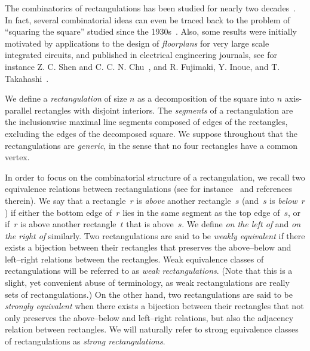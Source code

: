 \documentclass{amsart}
\theoremstyle{definition}
\newcommand{\darkblue}{\color{darkblue}} %
\newcommand{\defn}[1]{\textsl{\darkblue #1}} %
\begin{document}
The combinatorics of rectangulations has been studied for nearly two decades~\cite{MR2233287,MR2763051,MR2871762,MR2864445,MR3084577,MR3192492,MR3878132,MR4598046,MR4667583,AB24,ACFF24}.
In fact, several combinatorial ideas can even be traced back to the problem of ``squaring the square'' studied since the 1930s~\cite{A30,Abe32,MR0000470,MR0003040}. Also, some results were initially motivated by applications to the design of \defn{floorplans} for very large scale integrated circuits, and published in electrical engineering journals, see for instance Z. C. Shen and C. C. N. Chu~\cite{SC03}, and R. Fujimaki, Y. Inoue, and T. Takahashi~\cite{FT07,TF08,ITF09,FIT09}.

We define a \defn{rectangulation} of size $n$ as a decomposition of the square into $n$ axis-parallel rectangles with disjoint interiors.
The \defn{segments} of a rectangulation are the inclusionwise maximal line segments composed of edges of the rectangles, excluding the edges of the decomposed square.
We suppose throughout that the rectangulations are \defn{generic}, in the sense that no four rectangles have a common vertex.

In order to focus on the combinatorial structure of a rectangulation, we recall two equivalence relations between rectangulations (see for instance~\cite{ACFF24} and references therein).
We say that a rectangle~$r$ is \defn{above} another rectangle~$s$ (and~$s$ is \defn{below}~$r$) if either the bottom edge of~$r$ lies in the same segment as the top edge of~$s$, or if~$r$ is above another rectangle~$t$ that is above~$s$.
We define \defn{on the left of} and \defn{on the right of} similarly.
Two rectangulations are said to be \defn{weakly equivalent} if there exists a bijection between their rectangles that preserves the \mbox{above--below} and left--right relations between the rectangles.
Weak equivalence classes of rectangulations will be referred to as \defn{weak rectangulations}.
(Note that this is a slight, yet convenient abuse of terminology, as weak rectangulations are really sets of rectangulations.)
On the other hand, two rectangulations are said to be \defn{strongly equivalent} when there exists a bijection between their rectangles that not only preserves the above--below and left--right relations, but also the adjacency relation between rectangles.
We will naturally refer to strong equivalence classes of rectangulations as \defn{strong rectangulations}.
\end{document}
